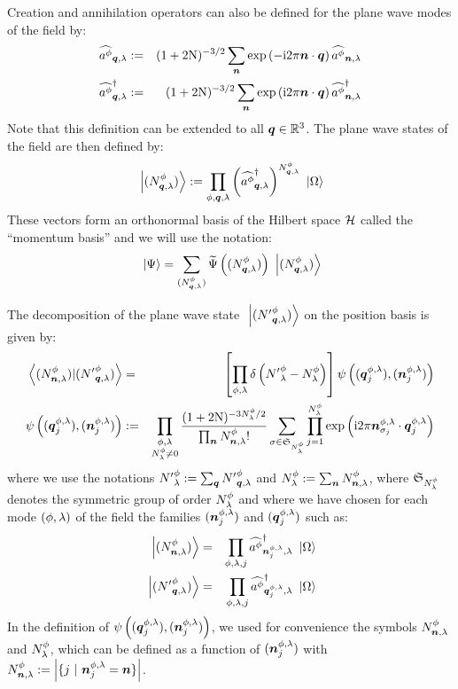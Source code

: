  Creation and annihilation operators can also be defined for the plane wave modes of the field by:
\begin{eqnarray*}
\aop \pt \q \sp & \eqdef & (1+2 \N)^{-3/2} \sum_{\n} \exp{-\i 2 \pi \n \ssp \q} \aop \pt \n \sp \\
\cop \pt \q \sp & \eqdef & (1+2 \N)^{-3/2} \sum_{\n} \exp{\i 2 \pi \n \ssp \q} \cop \pt \n \sp
\end{eqnarray*}
Note that this definition can be extended to all $\q \in \IR^3$. The plane wave states of the field are then defined by:
\begin{equation*}
\ket{\bFQ N \pt \q \sp} \eqdef \prod_{\pt,\q,\sp} \left( \cop \pt \q \sp \right)^{\bQ N \pt \q \sp} \ket{\vac}
\end{equation*}
These vectors form an orthonormal basis of the Hilbert space $\H$ called the ``momentum basis'' and we will use the notation:
\begin{equation*}
\ket\Psi = \sum_{\bFQ N \pt \q \sp} \FT\Psi \left( \bFQ N \pt \q \sp \right) \ket{\bFQ N \pt \q \sp}
\end{equation*}

 The decomposition of the plane wave state $\ket{\bFQ {N'} \pt \q \sp}$ on the position basis is given by:
\begin{eqnarray*}
\braket{\bFX N \pt \n \sp}{\bFQ {N'} \pt \q \sp} & = & \left[ \prod_{\pt, \sp} \delta\left( {N'}^\pt_\sp - N^\pt_\sp \right) \right] \psi \left( ( \q^{\pt, \sp}_j ), ( \n^{\pt, \sp}_j ) \right) \\
\psi \left( ( \q^{\pt, \sp}_j ), ( \n^{\pt, \sp}_j ) \right) & \eqdef & \prod_{\substack{\pt, \sp \\ N^\pt_\sp \neq 0}} \frac{(1+2 \N)^{-3 N^\pt_\sp / 2} }{\prod_{\n} \bX N \pt \n \sp !} \sum_{\sigma \in \mathfrak{S}_{N^\pt_\sp}} \prod_{j = 1}^{N^\pt_\sp} \exp{\i 2 \pi \n^{\pt, \sp}_{\sigma_j} \ssp \q^{\pt, \sp}_j}
\end{eqnarray*}
where we use the notations ${N'}^\pt_\sp \eqdef \sum_{\q} \bQ {N'} \pt \q \sp$ and $N^\pt_\sp \eqdef \sum_{\n} \bX N \pt \n \sp$, where $\mathfrak{S}_{N^\pt_\sp}$ denotes the symmetric group of order $N^\pt_\sp$ and where we have chosen for each mode $( \pt, \sp )$ of the field the families $( \n^{\pt, \sp}_j )$ and $( \q^{\pt, \sp}_j )$ such as:
\begin{eqnarray*}
\ket{\bFX N \pt \n \sp} & = & \prod_{\pt, \sp, j} \cop \pt {\n^{\pt, \sp}_j} \sp \ket{\vac} \\
\ket{\bFQ {N'} \pt \q \sp} & = & \prod_{\pt, \sp, j} \cop \pt {\q^{\pt, \sp}_j} \sp \ket{\vac}
\end{eqnarray*}
In the definition of $\psi \left( ( \q^{\pt, \sp}_j ), ( \n^{\pt, \sp}_j ) \right)$, we used for convenience the symbols $\bX N \pt \n \sp$ and $N^\pt_\sp$, which can be defined as a function of $( \n^{\pt, \sp}_j )$ with $\bX N \pt \n \sp \eqdef \left|  \{ j\ |\ \n^{\pt, \sp}_j = \n \} \right|$.

